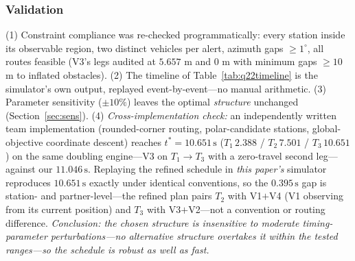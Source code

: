 \subsubsection{Validation}

(1) Constraint compliance was re-checked programmatically: every station inside its
observable region, two distinct vehicles per alert, azimuth gaps $\ge1^\circ$, all
routes feasible (V3's legs audited at $5.657$ m and $0$ m with minimum gaps
$\ge10$ m to inflated obstacles). (2) The timeline of Table~\ref{tab:q22timeline} is the
simulator's own output, replayed event-by-event---no manual arithmetic. (3) Parameter
sensitivity ($\pm10\%$) leaves the optimal \emph{structure} unchanged
(Section~\ref{sec:sens}). (4) \emph{Cross-implementation check:} an independently
written team implementation (rounded-corner routing, polar-candidate stations,
global-objective coordinate descent) reaches $t^{*}=10.651\,\mathrm{s}$
($T_1\,2.388$ / $T_2\,7.501$ / $T_3\,10.651$) on the same doubling engine---V3 on
$T_1\!\to\!T_3$ with a zero-travel second leg---against our $11.046\,\mathrm{s}$.
Replaying the refined schedule in \emph{this paper's} simulator reproduces
$10.651\,\mathrm{s}$ exactly under identical conventions, so the $0.395\,\mathrm{s}$
gap is station- and partner-level---the refined plan pairs $T_2$ with V1$+$V4 (V1
observing from its current position) and $T_3$ with V3$+$V2---not a convention or
routing difference. \emph{Conclusion: the chosen structure is
insensitive to
moderate timing-parameter perturbations---no alternative structure overtakes it within
the tested ranges---so the schedule is robust as well as fast.}
